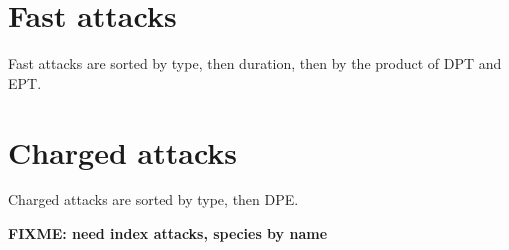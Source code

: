 \documentclass[ebook,10pt,openany,oneside]{memoir}
\begin{document}
\section{Fast attacks}
\label{sec:usersfast}
Fast attacks are sorted by type, then duration, then by the product of DPT and EPT\@.


\section{Charged attacks}
\label{sec:userscharged}
Charged attacks are sorted by type, then DPE\@.


\textbf{FIXME: need index attacks, species by name}

\backmatter

\end{document}
